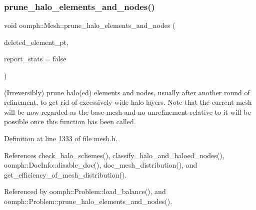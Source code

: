 \subsubsection{\texorpdfstring{prune\+\_\+halo\+\_\+elements\+\_\+and\+\_\+nodes()}{prune\_halo\_elements\_and\_nodes()}\hspace{0.1cm}{\footnotesize\ttfamily [1/2]}}
{\footnotesize\ttfamily void oomph\+::\+Mesh\+::prune\+\_\+halo\+\_\+elements\+\_\+and\+\_\+nodes (\begin{DoxyParamCaption}\item[{\hyperlink{classoomph_1_1Vector}{Vector}$<$ \hyperlink{classoomph_1_1GeneralisedElement}{Generalised\+Element} $\ast$$>$ \&}]{deleted\+\_\+element\+\_\+pt,  }\item[{const bool \&}]{report\+\_\+stats = {\ttfamily false} }\end{DoxyParamCaption})\hspace{0.3cm}{\ttfamily [inline]}}



(Irreversibly) prune halo(ed) elements and nodes, usually after another round of refinement, to get rid of excessively wide halo layers. Note that the current mesh will be now regarded as the base mesh and no unrefinement relative to it will be possible once this function has been called. 



Definition at line 1333 of file mesh.\+h.



References check\+\_\+halo\+\_\+schemes(), classify\+\_\+halo\+\_\+and\+\_\+haloed\+\_\+nodes(), oomph\+::\+Doc\+Info\+::disable\+\_\+doc(), doc\+\_\+mesh\+\_\+distribution(), and get\+\_\+efficiency\+\_\+of\+\_\+mesh\+\_\+distribution().



Referenced by oomph\+::\+Problem\+::load\+\_\+balance(), and oomph\+::\+Problem\+::prune\+\_\+halo\+\_\+elements\+\_\+and\+\_\+nodes().

\mbox{\label{classoomph_1_1Mesh_ac52d2d555dbbea12d33ef1b18a5ac2a9}} 
